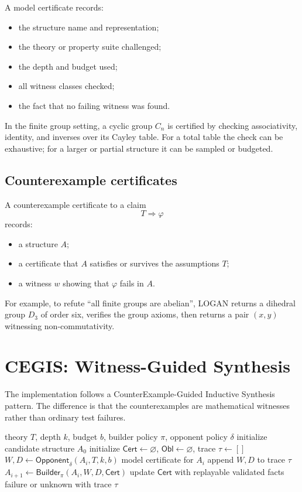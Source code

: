 \documentclass[11pt]{article}
\newcommand{\LOGAN}{\textsc{LOGAN}}
\newcommand{\Builder}{\ensuremath{\mathsf{Builder}}}
\newcommand{\Opponent}{\ensuremath{\mathsf{Opponent}}}
\newcommand{\Cert}{\ensuremath{\mathsf{Cert}}}
\newcommand{\Obl}{\ensuremath{\mathsf{Obl}}}
\begin{document}
A model certificate records:
\begin{itemize}[leftmargin=2em]
  \item the structure name and representation;
  \item the theory or property suite challenged;
  \item the depth and budget used;
  \item all witness classes checked;
  \item the fact that no failing witness was found.
\end{itemize}

In the finite group setting, a cyclic group \(C_n\) is certified by checking associativity, identity, and inverses over its Cayley table.  For a total table the check can be exhaustive; for a larger or partial structure it can be sampled or budgeted.

\subsection{Counterexample certificates}

A counterexample certificate to a claim
\[
  T \Rightarrow \varphi
\]
records:
\begin{itemize}[leftmargin=2em]
  \item a structure \(A\);
  \item a certificate that \(A\) satisfies or survives the assumptions \(T\);
  \item a witness \(w\) showing that \(\varphi\) fails in \(A\).
\end{itemize}

For example, to refute ``all finite groups are abelian'', \LOGAN{} returns a dihedral group \(D_3\) of order six, verifies the group axioms, then returns a pair \((x,y)\) witnessing non-commutativity.

\section{CEGIS: Witness-Guided Synthesis}

The implementation follows a CounterExample-Guided Inductive Synthesis pattern.  The difference is that the counterexamples are mathematical witnesses rather than ordinary test failures.

\begin{algorithm}[h]
\caption{LOGAN ModelBuilder}
\begin{algorithmic}[1]
\Require theory \(T\), depth \(k\), budget \(b\), builder policy \(\pi\), opponent policy \(\delta\)
\State initialize candidate structure \(A_0\)
\State initialize \(\Cert\gets\varnothing\), \(\Obl\gets\varnothing\), trace \(\tau\gets []\)
  \State \(W,D \gets \Opponent_\delta(A_i,T,k,b)\)
    \State \Return model certificate for \(A_i\)
  \EndIf
  \State append \(W,D\) to trace \(\tau\)
  \State \(A_{i+1}\gets \Builder_\pi(A_i,W,D,\Cert)\)
  \State update \(\Cert\) with replayable validated facts
\EndFor
\State \Return failure or unknown with trace \(\tau\)
\end{algorithmic}
\end{algorithm}
\end{document}
